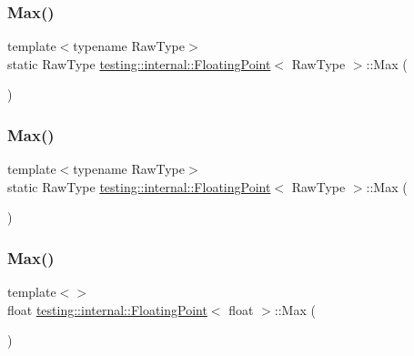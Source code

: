 \subsubsection{\texorpdfstring{Max()}{Max()}\hspace{0.1cm}{\footnotesize\ttfamily [2/9]}}
{\footnotesize\ttfamily template$<$typename Raw\+Type$>$ \\
static Raw\+Type \mbox{\hyperlink{classtesting_1_1internal_1_1_floating_point}{testing\+::internal\+::\+Floating\+Point}}$<$ Raw\+Type $>$\+::Max (\begin{DoxyParamCaption}{ }\end{DoxyParamCaption})\hspace{0.3cm}{\ttfamily [static]}}

\mbox{\label{classtesting_1_1internal_1_1_floating_point_aae5954d8a57d3ff0987c6930cb68e114}} 
\subsubsection{\texorpdfstring{Max()}{Max()}\hspace{0.1cm}{\footnotesize\ttfamily [3/9]}}
{\footnotesize\ttfamily template$<$typename Raw\+Type$>$ \\
static Raw\+Type \mbox{\hyperlink{classtesting_1_1internal_1_1_floating_point}{testing\+::internal\+::\+Floating\+Point}}$<$ Raw\+Type $>$\+::Max (\begin{DoxyParamCaption}{ }\end{DoxyParamCaption})\hspace{0.3cm}{\ttfamily [static]}}

\mbox{\label{classtesting_1_1internal_1_1_floating_point_af2eda9331e679229a1baa3404b57b51d}} 
\subsubsection{\texorpdfstring{Max()}{Max()}\hspace{0.1cm}{\footnotesize\ttfamily [4/9]}}
{\footnotesize\ttfamily template$<$$>$ \\
float \mbox{\hyperlink{classtesting_1_1internal_1_1_floating_point}{testing\+::internal\+::\+Floating\+Point}}$<$ float $>$\+::Max (\begin{DoxyParamCaption}{ }\end{DoxyParamCaption})\hspace{0.3cm}{\ttfamily [inline]}}

